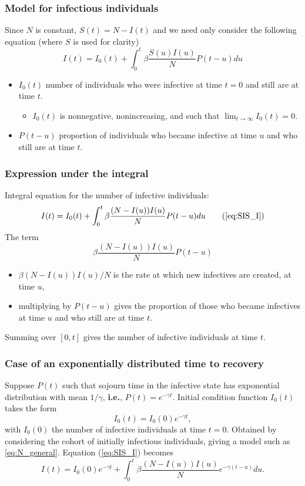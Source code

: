 \documentclass[aspectratio=169]{beamer}\usepackage[]{graphicx}\usepackage[]{xcolor}
\begin{document}
\begin{frame}\frametitle{Model for infectious individuals}
Since $N$ is constant, $S(t)=N-I(t)$ and we need only
consider the following equation (where $S$ is used for clarity)
\begin{equation}
I(t) = I_0(t)+ \int_0^t\beta\frac{S(u)I(u)}{N} P(t-u) du
\label{eq:SIS_I} 
\end{equation}
\vfill
\begin{itemize}
\item $I_0(t)$ number of individuals who were infective at time
$t=0$ and still are at time $t$.
\begin{itemize}
\item $I_0(t)$ is nonnegative, nonincreasing, and
such that $\lim_{t\to\infty}I_0(t)=0$.
\end{itemize}
\item $P(t-u)$ proportion of individuals who became infective at time $u$ and who still are at time $t$.
\end{itemize}
\end{frame}


\begin{frame}\frametitle{Expression under the integral}
Integral equation for the number of infective individuals: 
\begin{equation}
I(t) = I_0(t)+ \int_0^t\beta\frac{(N-I(u))I(u)}{N} P(t-u) du
\tag{\ref{eq:SIS_I}} 
\end{equation}
The term
\[
\beta\frac{(N-I(u))I(u)}{N} P(t-u)
\]
\begin{itemize}
\item $\beta (N-I(u))I(u)/N$ is the rate at which new infectives are created, at
time $u$,
\item multiplying by $P(t-u)$ gives the proportion of those who became
infectives at time $u$ and who still are at time $t$.
\end{itemize}
Summing over $[0,t]$ gives the number of infective individuals at time $t$.
\end{frame}


\begin{frame}\frametitle{Case of an exponentially distributed time to recovery}
Suppose $P(t)$ such that sojourn time in the infective
state has exponential distribution with mean $1/\gamma$,
\textbf{i.e.}, $P(t)=e^{-\gamma t}$.
\vfill
Initial condition function $I_0(t)$ takes the form
\[
I_0(t)=I_0(0)e^{-\gamma t},
\]
with $I_0(0)$ the number of infective individuals at time $t=0$. Obtained by considering the cohort of initially infectious individuals, giving a
model such as \eqref{eq:N_general}.
\vfill
Equation (\ref{eq:SIS_I}) becomes
\begin{equation}\label{eq:I_ODE}
I(t)=I_0(0)e^{-\gamma t}+\int_0^t \beta\frac{(N-I(u))I(u)}{N} e^{-\gamma
(t-u)}du.
\end{equation}
\end{frame}
\end{document}
